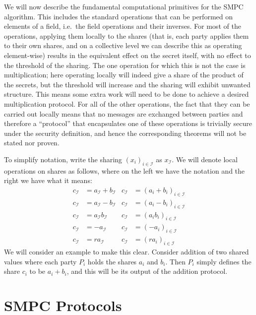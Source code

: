 \documentclass{article}
\theoremstyle{remark}
\begin{document}
We will now describe the fundamental computational primitives for the SMPC
algorithm. This includes the standard operations that can be performed on
elements of a field, i.e.\ the field operations and their inverses. For most of
the operations, applying them locally to the shares (that is, each party
applies them to their own shares, and on a collective level we can describe
this as operating element-wise) results in the equivalent effect on the secret
itself, with no effect to the threshold of the sharing. The one operation for
which this is not the case is multiplication; here operating locally will
indeed give a share of the product of the secrets, but the threshold will
increase and the sharing will exhibit unwanted structure. This means some extra
work will need to be done to achieve a desired multiplication protocol. For all
of the other operations, the fact that they can be carried out locally means
that no messages are exchanged between parties and therefore a ``protocol''
that encapsulates one of these operations is trivially secure under the
security definition, and hence the corresponding theorems will not be stated
nor proven.

To simplify notation, write the sharing ${(x_i)}_{i \in \mathcal{I}}$ as
$x_\mathcal{I}$. We will denote local operations on shares as follows, where on
the left we have the notation and the right we have what it means:
\begin{align*}
	c_\mathcal{I} &= a_\mathcal{I} + b_\mathcal{I} &
	c_\mathcal{I} &= {(a_i + b_i)}_{i \in \mathcal{I}}\\
	c_\mathcal{I} &= a_\mathcal{I} - b_\mathcal{I} &
	c_\mathcal{I} &= {(a_i - b_i)}_{i \in \mathcal{I}}\\
	c_\mathcal{I} &= a_\mathcal{I} b_\mathcal{I} &
	c_\mathcal{I} &= {(a_i b_i)}_{i \in \mathcal{I}}\\
	c_\mathcal{I} &= -a_\mathcal{I} &
	c_\mathcal{I} &= {(-a_i)}_{i \in \mathcal{I}}\\
	c_\mathcal{I} &= r a_\mathcal{I} &
	c_\mathcal{I} &= {(r a_i)}_{i \in \mathcal{I}}
\end{align*}
We will consider an example to make this clear. Consider addition of two shared
values where each party $P_i$ holds the shares $a_i$ and $b_i$. Then $P_i$
simply defines the share $c_i$ to be $a_i + b_i$, and this will be its output
of the addition protocol.

\section{SMPC Protocols}
\end{document}
